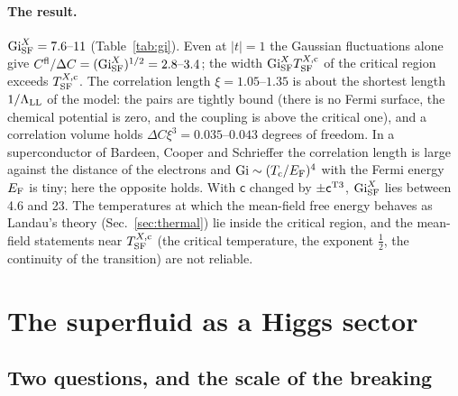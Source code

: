 \documentclass[aps,prd,onecolumn,superscriptaddress,nofootinbib,floatfix,longbibliography]{revtex4-2}
\newcommand{\LL}{{\rm LL}}
\newcommand{\SF}{{\rm SF}}
\begin{document}
\paragraph*{The result.} ${\rm Gi}^X_\SF=7.6\mbox{--}11$ (Table~\ref{tab:gi}). Even at $|t|=1$ the Gaussian fluctuations alone give
$C^{\rm fl}/\Delta C=({\rm Gi}^X_\SF)^{1/2}=2.8\mbox{--}3.4$; the width ${\rm Gi}^X_\SF T^{X,{\rm c}}_\SF$ of the critical region exceeds
$T^{X,{\rm c}}_\SF$. The correlation length $\xi=1.05\mbox{--}1.35$ is about the shortest length $1/\Lambda_\LL$ of the model: the pairs are tightly
bound (there is no Fermi surface, the chemical potential is zero, and the coupling is above the critical one), and a correlation
volume holds $\Delta C\xi^3=0.035\mbox{--}0.043$ degrees of freedom. In a superconductor of Bardeen, Cooper and Schrieffer the correlation
length is large against the distance of the electrons and ${\rm Gi}\sim(T_{\rm c}/E_{\rm F})^4$ with the Fermi energy $E_{\rm F}$ is tiny; here
the opposite holds. With $\mathsf c$ changed by $\pm\mathsf c^{\rm T3}$, ${\rm Gi}^X_\SF$ lies between 4.6 and 23. The temperatures at
which the mean-field free energy behaves as Landau's theory (Sec.~\ref{sec:thermal}) lie inside the critical region, and the
mean-field statements near $T^{X,{\rm c}}_\SF$ (the critical temperature, the exponent $\frac12$, the continuity of the transition) are
not reliable.

\section{The superfluid as a Higgs sector}
\label{sec:higgs}

\subsection{Two questions, and the scale of the breaking}
\end{document}
